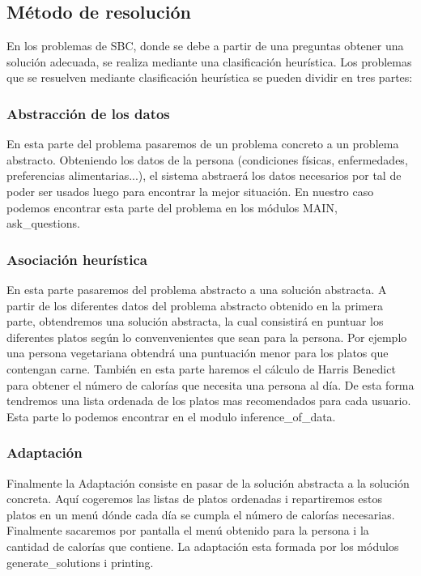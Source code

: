 \documentclass[12]{article}
\begin{document}
\subsection{Método de resolución}

En los problemas de SBC, donde se debe a partir de una preguntas obtener una solución adecuada, se realiza mediante una clasificación heurística.
Los problemas que se resuelven mediante clasificación heurística se pueden dividir en tres partes:

\subsubsection{Abstracción de los datos}

En esta parte del problema pasaremos de un problema concreto a un problema abstracto. 
Obteniendo los datos de la persona (condiciones físicas, enfermedades, preferencias alimentarias...), el sistema abstraerá los datos necesarios por tal de poder ser usados luego para encontrar la mejor situación.
En nuestro caso podemos encontrar esta parte del problema en los módulos MAIN, ask\_questions.

\subsubsection{Asociación heurística}

En esta parte pasaremos del problema abstracto a una solución abstracta.
A partir de los diferentes datos del problema abstracto obtenido en la primera parte, obtendremos una solución abstracta, la cual consistirá en puntuar los diferentes platos según lo convenvenientes que sean para la persona.
Por ejemplo una persona vegetariana obtendrá una puntuación menor para los platos que contengan carne.
También en esta parte haremos el cálculo de Harris Benedict para obtener el número de calorías que necesita una persona al día.
De esta forma tendremos una lista ordenada de los platos mas recomendados para cada usuario.
Esta parte lo podemos encontrar en el modulo inference\_of\_data.

\subsubsection{Adaptación}

Finalmente la Adaptación consiste en pasar de la solución abstracta a la solución concreta.
Aquí cogeremos las listas de platos ordenadas i repartiremos estos platos en un menú dónde cada día se cumpla el número de calorías necesarias.
Finalmente sacaremos por pantalla el menú obtenido para la persona i la cantidad de calorías que contiene.
La adaptación esta formada por los módulos generate\_solutions i printing.
\end{document}
